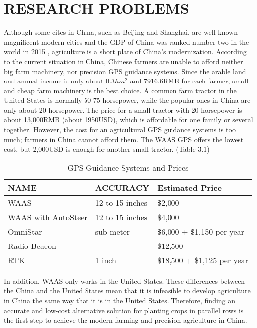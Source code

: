 \chapter{RESEARCH PROBLEMS}


Although some cites in China, such as Beijing and Shanghai, are well-known magnificent modern cities and the GDP of China was ranked number two in the world in 2015 \cite{GDP2015}, agriculture is a short plate of China's modernization. According to the current situation in China, Chinese farmers are unable to afford neither big farm machinery, nor precision GPS guidance systems. Since the arable land and annual income is only about 0.3$hm^{2}$ and 7916.6RMB for each farmer, small and cheap farm machinery is the best choice. A common farm tractor in the United States is normally 50-75 horsepower, while the popular ones in China are only about 20 horsepower. The price for a small tractor with 20 horsepower is about 13,000RMB (about 1950USD), which is affordable for one family or several together. However, the cost for an agricultural GPS guidance systems is too much; farmers in China cannot afford them. The WAAS GPS offers the lowest cost, but 2,000USD is enough for another small tractor. (Table 3.1) 
\begin{table}[ht!]
\caption{GPS Guidance Systems and Prices \cite{PriceR}}
\begin{center}	
\begin{tabular}{|l|l|l|}
\hline
NAME & ACCURACY & Estimated Price \\ 
\hline
WAAS & 12 to 15 inches & \$2,000 \\
\hline
WAAS with AutoSteer &  12 to 15 inches & \$4,000\\
\hline
OmniStar & sub-meter & \$6,000 + \$1,150 per year\\
\hline
Radio Beacon & - & \$12,500\\
\hline
RTK & 1 inch & \$18,500 + \$1,125 per year\\
\hline
\end{tabular}
\end{center}					
\end{table}

In addition, WAAS only works in the United States. These differences between the China and the United States mean that it is infeasible to develop agriculture in China the same way that it is in the United States. Therefore, finding an accurate and low-cost alternative solution for planting crops in parallel rows is the first step to achieve the modern farming and precision agriculture in China.

